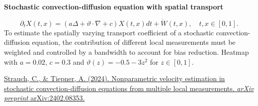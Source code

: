 {\myfontsize
\begin{center}
\textbf{Stochastic convection-diffusion equation with spatial transport}
\end{center}
\begin{equation*}
\partial_tX(t, x)=(a\Delta+ \vartheta\cdot\nabla + c)X(t,x)dt +\dot{W}(t, x), \quad t,x \in [0,1].
\end{equation*}
To estimate the spatially varying transport coefficient of a stochastic convection-diffusion equation, the contribution of different local measurements must be weighted and controlled by a bandwidth to account for bias reduction. Heatmap with $a=0.02$, $c=0.3$ and $\vartheta(z)=-0.5-3z^2$ for $z \in [0,1]$.\\ \par}
{\fontsize{12}{4}\selectfont
\href{https://arxiv.org/pdf/2402.08353.pdf}{Strauch, C., \& Tiepner, A. (2024). Nonparametric velocity estimation in stochastic convection-diffusion equations from multiple local measurements. \textit{arXiv preprint} arXiv:2402.08353.}
\par
}
